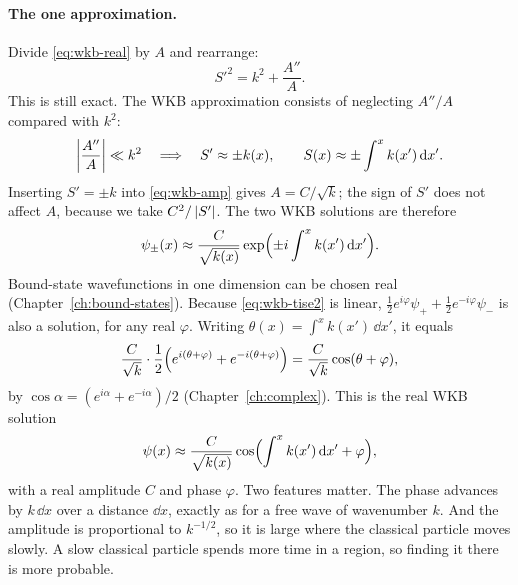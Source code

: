 \paragraph{The one approximation.} Divide \cref{eq:wkb-real} by $A$ and rearrange:
\begin{equation}
S'^2=k^2+\frac{A''}{A}.
\label{eq:wkb-eikonal}
\end{equation}
This is still exact. The WKB approximation consists of neglecting $A''/A$ compared with $k^2$:
\begin{equation}
\left\lvert \frac{A''}{A}\right\rvert\ll k^2\quad\Longrightarrow\quad S'\approx\pm k(x),\qquad S(x)\approx\pm\int^x k(x')\,\mathrm{d} x'.
\label{eq:wkb-Sapprox}
\end{equation}
Inserting $S'=\pm k$ into \cref{eq:wkb-amp} gives $A=C/\sqrt{k}$; the sign of $S'$ does not affect $A$, because we take $C^2/\left\lvert S'\right\rvert$. The two WKB solutions are therefore
\begin{equation}
\psi_\pm(x)\approx\frac{C}{\sqrt{k(x)}}\exp\Bigl(\pm i\int^x k(x')\,\mathrm{d} x'\Bigr).
\label{eq:wkb-psi}
\end{equation}
Bound-state wavefunctions in one dimension can be chosen real (Chapter~\ref{ch:bound-states}). Because \cref{eq:wkb-tise2} is linear, $\tfrac12e^{i\varphi}\psi_++\tfrac12e^{-i\varphi}\psi_-$ is also a solution, for any real $\varphi$. Writing $\theta(x)=\int^xk(x')\,\dd x'$, it equals
\[
\frac{C}{\sqrt k}\cdot\frac12\Bigl(e^{i(\theta+\varphi)}+e^{-i(\theta+\varphi)}\Bigr)=\frac{C}{\sqrt k}\cos(\theta+\varphi),
\]
by $\cos\alpha=(e^{i\alpha}+e^{-i\alpha})/2$ (Chapter~\ref{ch:complex}). This is the real WKB solution
\begin{equation}
\psi(x)\approx\frac{C}{\sqrt{k(x)}}\cos\Bigl(\int^x k(x')\,\mathrm{d} x'+\varphi\Bigr),
\label{eq:wkb-psireal}
\end{equation}
with a real amplitude $C$ and phase $\varphi$. Two features matter. The phase advances by $k\,\dd x$ over a distance $\dd x$, exactly as for a free wave of wavenumber $k$. And the amplitude is proportional to $k^{-1/2}$, so it is large where the classical particle moves slowly. A slow classical particle spends more time in a region, so finding it there is more probable.

